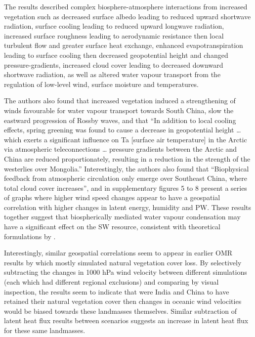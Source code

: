 The results described complex biosphere-atmosphere interactions from increased vegetation such as decreased surface albedo leading to reduced upward shortwave radiation, surface cooling leading to reduced upward longwave radiation, increased surface roughness leading to aerodynamic resistance then local turbulent flow and greater surface heat exchange, enhanced evapotranspiration leading to surface cooling then decreased geopotential height and changed pressure-gradients, increased cloud cover leading to decreased downward shortwave radiation, as well as altered water vapour transport from the regulation of low-level wind, surface moisture and temperatures. 

The authors also found that increased vegetation induced a strengthening of winds favourable for water vapour transport towards South China, slow the eastward progression of Rossby waves, and that “In addition to local cooling effects, spring greening was found to cause a decrease in geopotential height … which exerts a significant influence on Ta [surface air temperature] in the Arctic via atmospheric teleconnections … pressure gradients between the Arctic and China are reduced proportionately, resulting in a reduction in the strength of the westerlies over Mongolia.” Interestingly, the authors also found that “Biophysical feedback from atmospheric circulation only emerge over Southeast China, where total cloud cover increases”, and in supplementary figures 5 to 8 present a series of graphs where higher wind speed changes appear to have a geospatial correlation with higher changes in latent energy, humidity and \ac{PW}. These results together suggest that biospherically mediated water vapour condensation may have a significant effect on the \ac{SW} resource, consistent with theoretical formulations by \citet{makarieva2013}.

Interestingly, similar geospatial correlations seem to appear in earlier \ac{OMR} results by \citet{zhao2002} which mostly simulated natural vegetation cover loss. By selectively subtracting the changes in 1000 hPa wind velocity between different simulations (each which had different regional exclusions) and comparing by visual inspection, the results seem to indicate that were India and China to have retained their natural vegetation cover then changes in oceanic wind velocities would be biased towards these landmasses themselves. Similar subtraction of latent heat flux results between scenarios suggests an increase in latent heat flux for these same landmasses.

